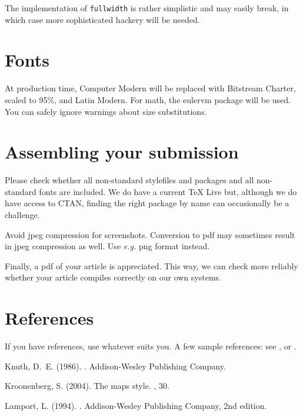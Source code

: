 \documentclass[nosubsub]{maps}
\begin{document}
The implementation of \texttt{fullwidth} is rather simplistic and
may easily break, in which case more sophisticated hackery will be
needed.

\section{Fonts}

At production time, Computer Modern will be replaced with Bitstream
Charter, scaled to 95\%, and Latin Modern. For math, the eulervm
package will be used. You can safely ignore warnings about size
substitutions.

\section{Assembling your submission}

Please check whether all non-standard stylefiles and packages and all
non-standard fonts are included. We do have a current \TeX{} Live but,
although we do have access to CTAN, finding the right package by
name can occasionally be a challenge.

Avoid jpeg compression for screenshots. Conversion to pdf may
sometimes result in jpeg compression as well. Use \emph{e.g.} png
format instead.

Finally, a pdf of your article is appreciated. This way, we can
check more reliably whether your article compiles
correctly on our own systems.

\section{References}

If you have references, use whatever suits you. A few sample references:
see \cite{knuth}, \cite{mapsclass} or \cite{lamport}.

\theendnotes

%
%

\begin{thebibliography}{}

Knuth, D.~E. (1986).
.
\newblock Addison-Wesley Publishing Company.

Kroonenberg, S. (2004).
\newblock The maps style.
, 30.

Lamport, L. (1994).
.
\newblock Addison-Wesley Publishing Company, 2nd edition.

\end{thebibliography}
\end{document}
